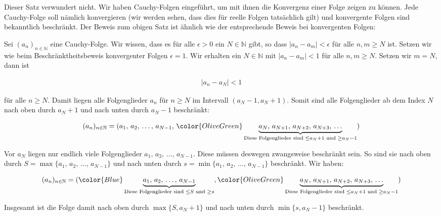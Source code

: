 \documentclass[fontsize=9pt,
               parskip=half-,
               DIV=14,
               listof=chapterentry,
               tocflat]{scrbook}
\begin{document}
\begin{explanation*}
Dieser Satz verwundert nicht. Wir haben Cauchy-Folgen eingeführt, um mit ihnen die Konvergenz einer Folge zeigen zu können. Jede Cauchy-Folge soll nämlich konvergieren (wir werden sehen, dass dies für reelle Folgen tatsächlich gilt) und konvergente Folgen sind bekanntlich beschränkt. Der Beweis zum obigen Satz ist ähnlich wie der entsprechende Beweis bei konvergenten Folgen:

\end{explanation*}

\begin{proof*}
Sei $(a_{n})_{n\in \mathbb {N} }$ eine Cauchy-Folge. Wir wissen, dass es für alle $\epsilon >0$ ein $N\in \mathbb {N} $ gibt, so dass $|a_{n}-a_{m}|<\epsilon $ für alle $n,m\geq N$ ist. Setzen wir wie beim Beschränktheitsbeweis konvergenter Folgen $\epsilon =1$. Wir erhalten ein $N\in \mathbb {N} $ mit $|a_{n}-a_{m}|<1$ für alle $n,m\geq N$. Setzen wir $m=N$, dann ist

\begin{align*}
|a_{n}-a_{N}|<1
\end{align*}

für alle $n\geq N$. Damit liegen alle Folgenglieder $a_{n}$ für $n\geq N$ im Intervall $(a_{N}-1,a_{N}+1)$. Somit sind alle Folgenglieder ab dem Index $N$ nach oben durch $a_{N}+1$ und nach unten durch $a_{N}-1$ beschränkt:

\begin{align*}
(a_{n})_{n\in \mathbb {N} }=(a_{1},\,a_{2},\,\ldots ,\,a_{N-1},\,{\color {OliveGreen}\underbrace {a_{N},\,a_{N+1},\,a_{N+2},\,a_{N+3},\,\ldots } _{{\text{Diese Folgenglieder sind }}\leq a_{N}+1{\text{ und }}\geq a_{N}-1}})
\end{align*}

Vor $a_{N}$ liegen nur endlich viele Folgenglieder $a_{1},\,a_{2},\,\ldots ,\,a_{N-1}$. Diese müssen deswegen zwangsweise beschränkt sein. So sind sie nach oben durch $S=\max\{a_{1},\,a_{2},\,\ldots ,\,a_{N-1}\}$ und nach unten durch $s=\min\{a_{1},\,a_{2},\,\ldots ,\,a_{N-1}\}$ beschränkt. Wir haben:

\begin{align*}
(a_{n})_{n\in \mathbb {N} }=({\color {Blue}\underbrace {a_{1},\,a_{2},\,\ldots ,\,a_{N-1}} _{{\text{Diese Folgenglieder sind }}\leq S{\text{ und }}\geq s}},{\color {OliveGreen}\underbrace {a_{N},\,a_{N+1},\,a_{N+2},\,a_{N+3},\,\ldots } _{{\text{Diese Folgenglieder sind }}\leq a_{N}+1{\text{ und }}\geq a_{N}-1}})
\end{align*}

Insgesamt ist die Folge damit nach oben durch $\max\{S,a_{N}+1\}$ und nach unten durch $\min\{s,a_{N}-1\}$ beschränkt.

\end{proof*}
\end{document}
